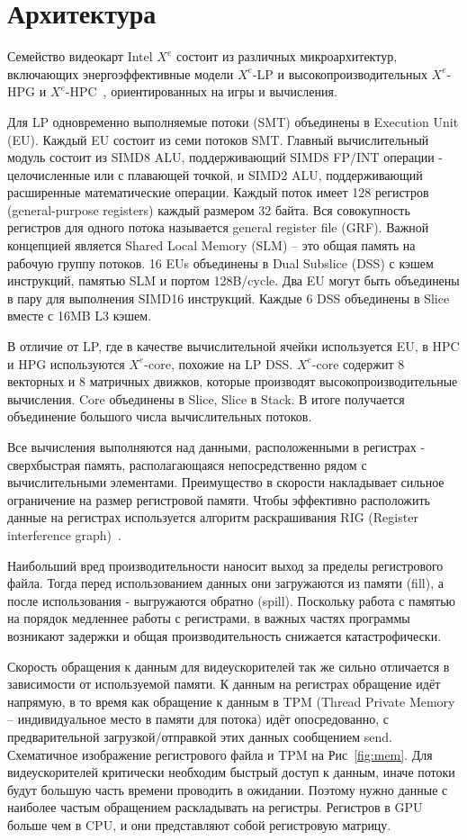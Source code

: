 \section{Архитектура}
\label{sec:Arch}

Семейство видеокарт Intel $X^e$ состоит из различных микроархитектур, включающих энергоэффективные модели $X^e$-LP и высокопроизводительных $X^e$-HPG и $X^e$-HPC~\cite{intelArch}, ориентированных на игры и вычисления.

Для LP одновременно выполняемые потоки (SMT) объединены в Execution Unit (EU).
Каждый EU состоит из семи потоков SMT. Главный вычислительный модуль состоит из SIMD8 ALU, поддерживающий SIMD8 FP/INT операции - целочисленные или с плавающей точкой, и SIMD2 ALU, поддерживающий расширенные математические операции.
Каждый поток имеет 128 регистров (general-purpose registers) каждый размером 32 байта.
Вся совокупность регистров для одного потока называется general register file (GRF).
Важной концепцией является Shared Local Memory (SLM) -- это общая память на рабочую группу потоков.
16 EUs объединены в Dual Subslice (DSS) с кэшем инструкций, памятью SLM и портом 128B/cycle.
Два EU могут быть объединены в пару для выполнения SIMD16 инструкций. Каждые 6 DSS объединены в Slice вместе с 16MB L3 кэшем.

В отличие от LP, где в качестве вычислительной ячейки используется EU, в HPC и HPG используются $X^e$-core, похожие на LP DSS.
$X^e$-core содержит 8 векторных и 8 матричных движков, которые производят высокопроизводительные вычисления.
Core объединены в Slice, Slice в Stack.
В итоге получается объединение большого числа вычислительных потоков.

Все вычисления выполняются над данными, расположенными в регистрах - сверхбыстрая память, располагающаяся непосредственно рядом с вычислительными элементами.
Преимущество в скорости накладывает сильное ограничение на размер регистровой памяти.
Чтобы эффективно расположить данные на регистрах используется алгоритм раскрашивания RIG (Register interference graph)~\cite{regalloc}.

Наибольший вред производительности наносит выход за пределы регистрового файла.
Тогда перед использованием данных они загружаются из памяти (fill), а после использования - выгружаются обратно (spill).
Поскольку работа с памятью на порядок медленнее работы с регистрами, в важных частях программы возникают задержки и общая производительность снижается катастрофически.

Скорость обращения к данным для видеускорителей так же сильно отличается в зависимости от используемой памяти.
К данным на регистрах обращение идёт напрямую, в то время как обращение к данным в TPM (Thread Private Memory -- индивидуальное место в памяти для потока) идёт опосредованно, с предварительной загрузкой/отправкой этих данных сообщением send.
Схематичное изображение регистрового файла и TPM на Рис~\ref{fig:mem}.
Для видеускорителей критически необходим быстрый доступ к данным, иначе потоки будут большую часть времени проводить в ожидании.
Поэтому нужно данные с наиболее частым обращением раскладывать на регистры. Регистров в GPU больше чем в CPU, и они представляют собой регистровую матрицу.

